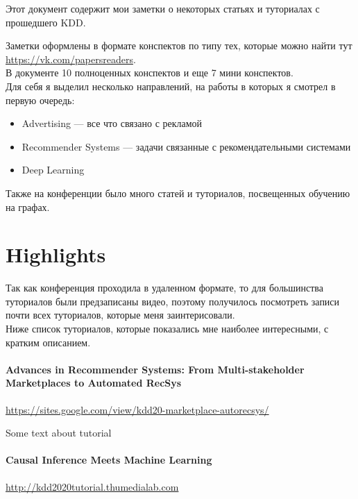 Этот документ содержит мои заметки о некоторых статьях и туториалах с прошедшего KDD.

Заметки оформлены в формате конспектов по типу тех, которые можно найти тут \url{https://vk.com/papersreaders}. \\

В документе 10 полноценных конспектов и еще 7 мини конспектов. \\

Для себя я выделил несколько направлений, на работы в которых я смотрел в первую очередь:
\begin{itemize}
    \item Advertising --- все что связано с рекламой
    \item Recommender Systems --- задачи связанные с рекомендательными системами
    \item Deep Learning
\end{itemize}

Также на конференции было много статей и туториалов, посвещенных обучению на графах.

\section*{Highlights}

Так как конференция проходила в удаленном формате, то для большинства туториалов были предзаписаны видео, поэтому получилось посмотреть записи почти всех туториалов, которые меня заинтерисовали. \\

Ниже список туториалов, которые показались мне наиболее интересными, с кратким описанием.

\paragraph{Advances in Recommender Systems: From Multi-stakeholder Marketplaces to Automated RecSys} $ $\\

\url{https://sites.google.com/view/kdd20-marketplace-autorecsys/}

Some text about tutorial

\paragraph{Causal Inference Meets Machine Learning} $ $\\

\url{http://kdd2020tutorial.thumedialab.com}

